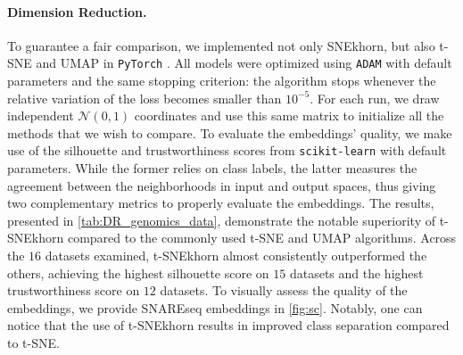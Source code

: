 \paragraph{Dimension Reduction.}
To guarantee a fair comparison, we implemented not only SNEkhorn, but also t-SNE and UMAP in \texttt{PyTorch} \citep{paszke2017automatic}. 
All models were optimized using \texttt{ADAM} \citep{kingma2014adam} with default parameters and the same stopping criterion: the algorithm stops whenever the relative variation of the loss becomes smaller than $10^{-5}$. For each run, we draw independent $\mathcal{N}(0,1)$ coordinates and use this same matrix to initialize all the methods that we wish to compare. To evaluate the embeddings' quality, we make use of the silhouette \citep{rousseeuw1987silhouettes} and trustworthiness \citep{venna2001neighborhood} scores from \texttt{scikit-learn} \citep{scikit-learn} with default parameters.  While the former relies on class labels, the latter measures the agreement between the neighborhoods in input and output spaces, thus giving two complementary metrics to properly evaluate the embeddings. 
The results, presented in \cref{tab:DR_genomics_data}, demonstrate the notable superiority of t-SNEkhorn compared to the commonly used t-SNE and UMAP algorithms. Across the $16$ datasets examined, t-SNEkhorn almost consistently outperformed the others, achieving the highest silhouette score on $15$ datasets and the highest trustworthiness score on $12$ datasets. To visually assess the quality of the embeddings, we provide SNAREseq embeddings in \cref{fig:sc}. Notably, one can notice that the use of t-SNEkhorn results in improved class separation compared to t-SNE.
 
